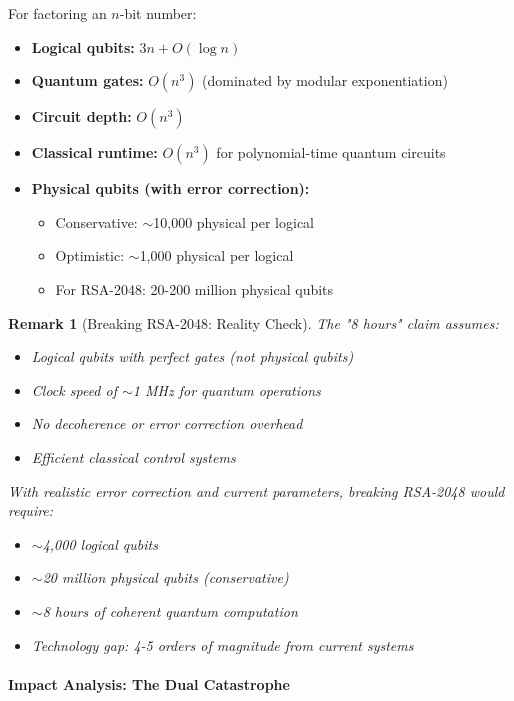 \documentclass[11pt,a4paper]{article}
\newtheorem{remark}{Remark}
\begin{document}
For factoring an $n$-bit number:
\begin{itemize}
    \item \textbf{Logical qubits:} $3n + O(\log n)$
    \item \textbf{Quantum gates:} $O(n^3)$ (dominated by modular exponentiation)
    \item \textbf{Circuit depth:} $O(n^3)$ 
    \item \textbf{Classical runtime:} $O(n^3)$ for polynomial-time quantum circuits
    \item \textbf{Physical qubits (with error correction):}
    \begin{itemize}
        \item Conservative: $\sim$10,000 physical per logical
        \item Optimistic: $\sim$1,000 physical per logical
        \item For RSA-2048: 20-200 million physical qubits
    \end{itemize}
\end{itemize}

\begin{remark}[Breaking RSA-2048: Reality Check]
The "8 hours" claim assumes:
\begin{itemize}
    \item Logical qubits with perfect gates (not physical qubits)
    \item Clock speed of $\sim$1 MHz for quantum operations
    \item No decoherence or error correction overhead
    \item Efficient classical control systems
\end{itemize}
With realistic error correction and current parameters, breaking RSA-2048 would require:
\begin{itemize}
    \item $\sim$4,000 logical qubits
    \item $\sim$20 million physical qubits (conservative)
    \item $\sim$8 hours of coherent quantum computation
    \item Technology gap: 4-5 orders of magnitude from current systems
\end{itemize}
\end{remark}

\paragraph{Impact Analysis: The Dual Catastrophe}
\end{document}
